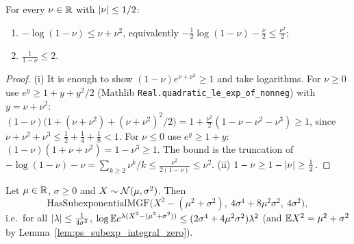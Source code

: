 \begin{lemma}\label{lem:log_ineq_nu}
\leanok
For every $\nu \in \mathbb{R}$ with $\lvert \nu \rvert \le 1/2$:
\begin{enumerate}
  \item[(i)] $-\log(1-\nu) \le \nu + \nu^2$, equivalently $-\frac12\log(1-\nu) - \frac{\nu}{2} \le \frac{\nu^2}{2}$;
  \item[(ii)] $\frac{1}{1-\nu} \le 2$.
\end{enumerate}
\end{lemma}

\begin{proof}
\leanok
(i) It is enough to show $(1-\nu)e^{\nu+\nu^2} \ge 1$ and take logarithms. For $\nu \ge 0$ use
$e^y \ge 1 + y + y^2/2$ (Mathlib \texttt{Real.quadratic\_le\_exp\_of\_nonneg}) with $y = \nu+\nu^2$:
$(1-\nu)\big(1 + (\nu+\nu^2) + (\nu+\nu^2)^2/2\big) = 1 + \frac{\nu^2}{2}(1 - \nu - \nu^2 - \nu^3) \ge 1$,
since $\nu + \nu^2 + \nu^3 \le \frac12+\frac14+\frac18 < 1$. For $\nu \le 0$ use $e^y \ge 1+y$:
$(1-\nu)(1+\nu+\nu^2) = 1 - \nu^3 \ge 1$. The bound is the truncation of
$-\log(1-\nu) - \nu = \sum_{k\ge2}\nu^k/k \le \frac{\nu^2}{2(1-\nu)} \le \nu^2$.
(ii) $1 - \nu \ge 1 - \lvert \nu \rvert \ge \frac12$.
\end{proof}

\begin{lemma}\label{lem:gaussian_square_subexp}
\leanok
{}
Let $\mu\in\mathbb{R}$, $\sigma \ge 0$ and $X \sim \mathcal{N}(\mu,\sigma^2)$. Then
\[
  \mathrm{HasSubexponentialMGF}\big(X^2 - (\mu^2 + \sigma^2),\ 4\sigma^4 + 8\mu^2\sigma^2,\ 4\sigma^2\big),
\]
i.e.\ for all $\lvert \lambda \rvert \le \frac{1}{4\sigma^2}$,
$\log\mathbb{E} e^{\lambda(X^2 - (\mu^2+\sigma^2))} \le (2\sigma^4 + 4\mu^2\sigma^2)\lambda^2$
(and $\mathbb{E} X^2 = \mu^2 + \sigma^2$ by Lemma~\ref{lem:ps_subexp_integral_zero}).
\end{lemma}

